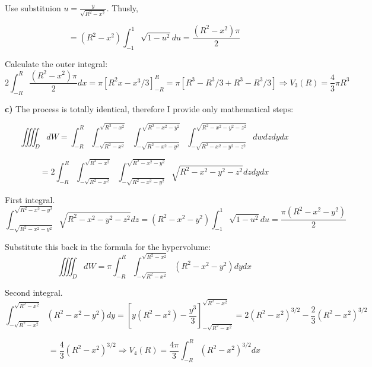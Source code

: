 \documentclass{article}
\begin{document}
Use substituion $u = \frac{y}{\sqrt{R^2-x^2}}$. Thusly,

\begin{equation*}
  = (R^2-x^2) \int_{-1}^{1} \sqrt{1 - u^2} du = \frac{(R^2 - x^2)\pi}{2}
\end{equation*} 

Calculate the outer integral:
\begin{equation*}
  2 \int_{-R}^{R} \frac{(R^2 - x^2)\pi}{2} dx = \pi [R^2x - x^3/3]_{-R}^{R} = \pi [ R^3 - R^3 / 3 + R^3 - R^3 / 3 ] \Rightarrow V_3(R) =  \frac{4}{3}\pi R^3
\end{equation*}

\textbf{c)} The process is totally identical, therefore I provide only mathematical steps:

\begin{equation*}
\iiiint_{D} dW = \int_{-R}^{R} \int_{-\sqrt{R^2 - x^2}}^{\sqrt{R^2 - x^2}} \int_{-\sqrt{R^2 - x^2 - y^2}}^{\sqrt{R^2 - x^2 - y^2}}\int_{-\sqrt{R^2 - x^2 - y^2 - z^2}}^{\sqrt{R^2 - x^2 - y^2 - z^2}}dwdzdydx
\end{equation*}

\begin{equation*}
  = 2 \int_{-R}^{R} \int_{-\sqrt{R^2 - x^2}}^{\sqrt{R^2 - x^2}} \int_{-\sqrt{R^2 - x^2 - y^2}}^{\sqrt{R^2 - x^2 - y^2}} \sqrt{R^2-x^2-y^2-z^2} dzdydx
\end{equation*}

First integral.
\begin{equation*}
  \int_{-\sqrt{R^2 - x^2 - y^2}}^{\sqrt{R^2 - x^2 - y^2}} \sqrt{R^2-x^2-y^2-z^2} dz = (R^2-x^2-y^2) \int_{-1}^{1} \sqrt{1-u^2} du = \frac{\pi (R^2-x^2-y^2)}{2}
\end{equation*}

Substitute this back in the formula for the hypervolume:
\begin{equation*}
  \iiiint_{D} dW = \pi \int_{-R}^{R} \int_{-\sqrt{R^2 - x^2}}^{\sqrt{R^2 - x^2}} (R^2 - x^2 - y^2) dydx
\end{equation*}

Second integral.
\begin{equation*}
  \int_{-\sqrt{R^2 - x^2}}^{\sqrt{R^2 - x^2}} (R^2 - x^2 - y^2) dy = [y(R^2-x^2) - \frac{y^3}{3}]_{-\sqrt{R^2 - x^2}}^{\sqrt{R^2 - x^2}} = 2(R^2-x^2)^{3/2} - \frac{2}{3} (R^2-x^2)^{3/2}
\end{equation*}

\begin{equation*}
  = \frac{4}{3} (R^2-x^2)^{3/2} \Rightarrow V_4(R) = \frac{4\pi}{3}\int_{-R}^{R} (R^2 - x^2)^{3/2} dx
\end{equation*}
\end{document}
